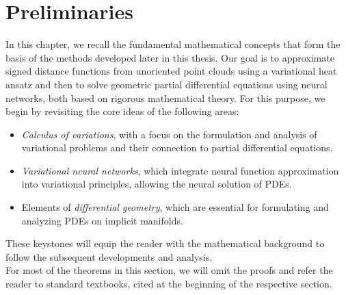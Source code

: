 \documentclass[draft,12pt,openany]{book}
\theoremstyle{plainnormal}
\theoremstyle{remark}
\begin{document}
\newpage
{}
\chapter{Preliminaries}\label{ch:prelim}
In this chapter, we recall the fundamental mathematical concepts that form the basis of the methods developed later in this thesis. Our goal is to approximate signed distance functions from unoriented point clouds using a variational heat ansatz and then to solve geometric partial differential equations using neural networks, both based on rigorous mathematical theory. For this purpose, we begin by revisiting the core ideas of the following areas:
\begin{itemize}
    \item \emph{Calculus of variations}, with a focus on the formulation and analysis of variational problems and their connection to partial differential equations.
    
    \item \emph{Variational neural networks}, which integrate neural function approximation into variational principles, allowing the neural solution of PDEs.
    
    \item Elements of \emph{differential geometry}, which are essential for formulating and analyzing PDEs on implicit manifolds.
\end{itemize}
These keystones will equip the reader with the mathematical background to follow the subsequent developments and analysis.\\
For most of the theorems in this section, we will omit the proofs and refer the reader to standard textbooks, cited at the beginning of the respective section.
\end{document}
